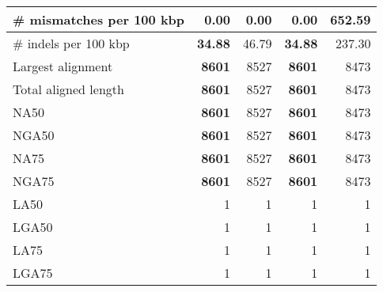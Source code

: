 \documentclass[12pt,a4paper]{article}
\begin{document}
\begin{table}[ht]
\begin{center}
\begin{tabular}{|l*{4}{|r}|}
\# mismatches per 100 kbp & {\bf 0.00} & {\bf 0.00} & {\bf 0.00} & 652.59 \\ \hline
\# indels per 100 kbp & {\bf 34.88} & 46.79 & {\bf 34.88} & 237.30 \\ \hline
Largest alignment & {\bf 8601} & 8527 & {\bf 8601} & 8473 \\ \hline
Total aligned length & {\bf 8601} & 8527 & {\bf 8601} & 8473 \\ \hline
NA50 & {\bf 8601} & 8527 & {\bf 8601} & 8473 \\ \hline
NGA50 & {\bf 8601} & 8527 & {\bf 8601} & 8473 \\ \hline
NA75 & {\bf 8601} & 8527 & {\bf 8601} & 8473 \\ \hline
NGA75 & {\bf 8601} & 8527 & {\bf 8601} & 8473 \\ \hline
LA50 & 1 & 1 & 1 & 1 \\ \hline
LGA50 & 1 & 1 & 1 & 1 \\ \hline
LA75 & 1 & 1 & 1 & 1 \\ \hline
LGA75 & 1 & 1 & 1 & 1 \\ \hline
\end{tabular}
\end{center}
\end{table}
\end{document}

